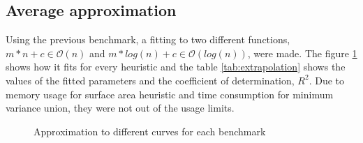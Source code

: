 \subsection{Average approximation}
Using the previous benchmark, a fitting to two different functions, $m*n+c \in \mathcal{O}(n)$ and $m*log(n)+c \in \mathcal{O}(log(n))$, were made. The figure \ref{fig:approx_extrapolation} shows how it fits for every heuristic and the table \ref{tab:extrapolation} shows the values of the fitted parameters and the coefficient of determination, $R^2$. Due to memory usage for surface area heuristic and time consumption for minimum variance union, they were not out of the usage limits.
\begin{figure}[h!]
  \centering
  
  \caption{Approximation to different curves for each benchmark}
  \label{fig:approx_extrapolation}
\end{figure}
